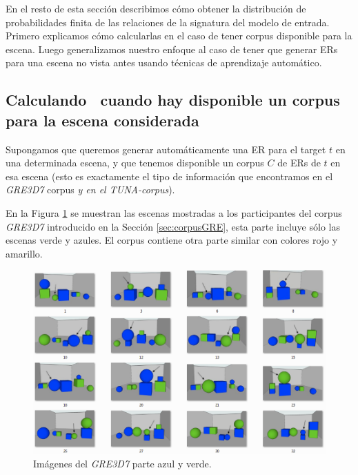 En el resto de esta secci\'on describimos c\'omo obtener la distribuci\'on de probabilidades finita de las relaciones de la signatura del modelo de entrada. Primero explicamos c\'omo calcularlas en el caso de tener corpus disponible para la escena. Luego generalizamos nuestro enfoque al caso de tener que generar ERs para una escena no vista antes usando t\'ecnicas de aprendizaje autom\'atico.  


\subsection{Calculando \puse\ cuando hay disponible un corpus para la escena considerada}
\label{sec:learning-corpus}

Supongamos que queremos generar autom\'aticamente una ER para el target $t$ en una
determinada escena, y que tenemos disponible un corpus $C$ de ERs de $t$
en esa escena (esto es exactamente el tipo de informaci\'on que encontramos en el
\textit{GRE3D7} corpus \textit{y en el TUNA-corpus}).

En la Figura \ref{verde-azul} se muestran las escenas mostradas a los participantes del corpus \textit{GRE3D7} introducido en la Secci\'on \ref{sec:corpusGRE}, esta parte incluye s\'olo las escenas verde y azules. El corpus contiene otra parte similar con colores rojo y amarillo.

\begin{figure}[h]
\centering
\includegraphics[width=1\textwidth]{images/corpusVerdeAzul.png}
\caption{Im\'agenes del \textit{GRE3D7} parte azul y verde.}
\label{verde-azul}
\end{figure}

